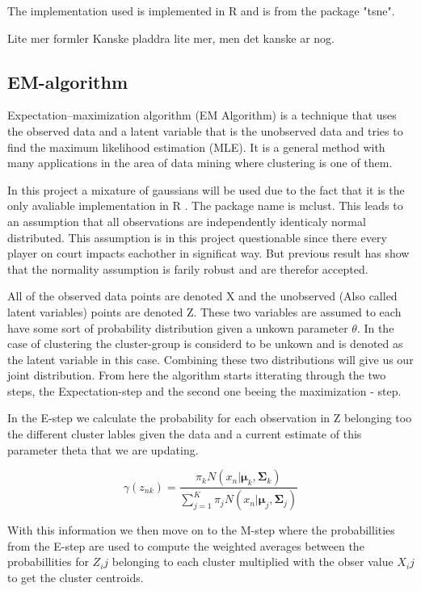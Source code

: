 \documentclass{article}
\begin{document}
The implementation used is implemented in R and is from the package "tsne". 

Lite mer formler 
Kanske pladdra lite mer, men det kanske ar nog.


\subsection{EM-algorithm}

Expectation–maximization algorithm  (EM Algorithm) is a technique that uses the observed data and a latent variable that is the unobserved data and tries to find the maximum likelihood estimation (MLE). It is a general method with many applications in the area of data mining where clustering is one of them.

In this project a mixature of gaussians will be used due to the fact that it is the only avaliable implementation in R . The package name is mclust. This leads to an assumption that all observations are independently identicaly normal distributed. This assumption is in this project questionable since there every player on court impacts eachother in significat way.  But previous result has show that the normality assumption is farily robust and are therefor accepted. 

All of the observed data points are denoted X and the unobserved (Also called latent variables) points are denoted Z. These two variables are assumed to each have some sort of probability distribution given a unkown parameter $\theta$. In the case of clustering the cluster-group is considerd to be unkown and is denoted as the latent variable in this case.  Combining these two distributions will give us our joint distribution. From here the algorithm starts itterating through the two steps, the Expectation-step and the second one beeing the maximization - step.


In the E-step we calculate the probability for each observation in Z belonging too the different cluster lables given the data and a current estimate of this parameter theta that we are updating.

$$\gamma(z_{nk}) = \frac{\pi_k N(x_n|\mathbf{\mu}_k,\mathbf{\Sigma}_k)} {\sum_{j=1}^{K}  \pi_jN(x_n|\mathbf{\mu}_j,\mathbf{\Sigma}_j)}$$

With this information we then move on to the M-step where the probabillities from the E-step are used to compute the weighted averages between the probabillities for $Z_ij$ belonging to each cluster multiplied with the obser value $X_ij$ to get the cluster centroids. 
\end{document}
